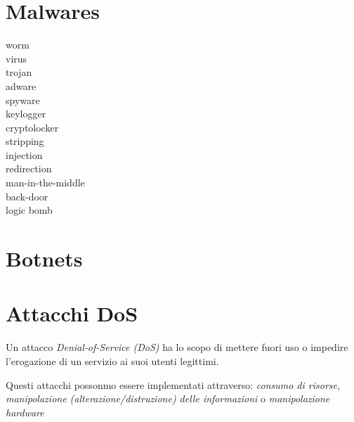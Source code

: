 \section{Malwares}

\begin{description}
  \item[worm]
  \item[virus]
  \item[trojan]
  \item[adware]
  \item[spyware]
  \item[keylogger]
  \item[cryptolocker]
  \item[stripping]
  \item[injection]
  \item[redirection]
  \item[man-in-the-middle]
  \item[back-door]
  \item[logic bomb]
\end{description}

\section{Botnets}

\section{Attacchi DoS}
Un attacco \textit{Denial-of-Service (DoS)} ha lo scopo di mettere fuori uso o impedire l'erogazione di un servizio ai suoi utenti legittimi.

Questi attacchi possonmo essere implementati attraverso: \textit{consumo di risorse}, \textit{manipolazione (alterazione/distruzione) delle informazioni} o \textit{manipolazione hardware}
